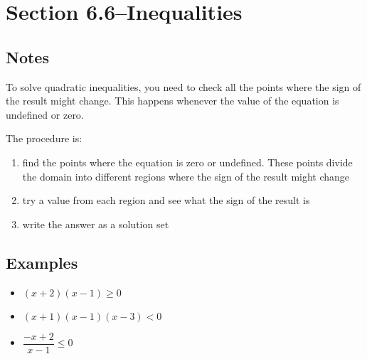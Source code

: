 \documentclass[fleqn,addpoints]{exam}
\begin{document}
\section{Section 6.6--Inequalities}

\subsection{Notes}
To solve quadratic inequalities, you need to check all the points where the sign of the result might change.  This
happens whenever the value of the equation is undefined or zero.  

The procedure is:

\begin{enumerate}
\item find the points where the equation is zero or undefined.  These points divide the domain into different
  regions where the sign of the result might change
\item try a value from each region and see what the sign of the result is
\item write the answer as a solution set
\end{enumerate}

\subsection{Examples}
\begin{itemize}
  \item $(x+2)(x-1) \geq 0$
  \item $(x+1)(x-1)(x-3) < 0$
  \item $\dfrac{-x+2}{x-1} \leq 0$
\end{itemize}
\end{document}
